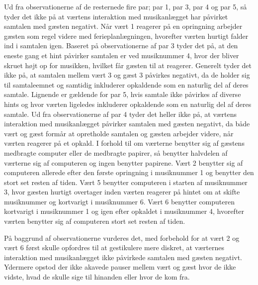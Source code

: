 Ud fra observationerne af de resternede fire par; par 1, par 3, par 4 og par 5, så tyder det ikke på at værtens interaktion med musikanlægget har påvirket samtalen med gæsten negativt. Når vært 1 reagerer på en opringning arbejder gæsten som regel videre med ferieplanlægningen, hvorefter værten hurtigt falder ind i samtalen igen. Baseret på observationerne af par 3 tyder det på, at den eneste gang et hint påvirker samtalen er ved musiknummer 4, hvor der bliver skruet højt op for musikken, hvilket får gæsten til at reagerer. Generelt tyder det ikke på, at samtalen mellem vært 3 og gæst 3 påvirkes negativt, da de holder sig til samtaleemnet og samtidig inkluderer opkaldende som en naturlig del af deres samtale. Lignende er gældende for par 5, hvis samtale ikke påvirkes af diverse hints og hvor værten ligeledes inkluderer opkaldende som en naturlig del af deres samtale. Ud fra observationerne af par 4 tyder det heller ikke på, at værtens interaktion med musikanlægget påvirker samtalen med gæsten negativt, da både vært og gæst formår at opretholde samtalen og gæsten arbejder videre, når værten reagerer på et opkald. \blankline
%
I forhold til om værterne benytter sig af gæstens medbragte computer eller de medbragte papirer, så benytter halvdelen af værterne sig af computeren og ingen benytter papirene. Vært 2 benytter sig af computeren allerede efter den første opringning i musiknummer 1 og benytter den stort set resten af tiden. Vært 5 benytter computeren i starten af musiknummer 3, hvor gæsten hurtigt overtager inden værten reagerer på hintet om at skifte musiknummer og kortvarigt i musiknummer 6. Vært 6 benytter computeren kortvarigt i musiknummer 1 og igen efter opkaldet i musiknummer 4, hvorefter værten benytter sig af computeren stort set resten af tiden. 

På baggrund af observationerne vurderes det, med forbehold for at vært 2 og vært 6 først skulle opfordres til at gestikulere mere diskret, at værternes interaktion med musikanlægget ikke påvirkede samtalen med gæsten negativt. Ydermere opstod der ikke akavede pauser mellem vært og gæst hvor de ikke vidste, hvad de skulle sige til hinanden eller hvor de kom fra. 

